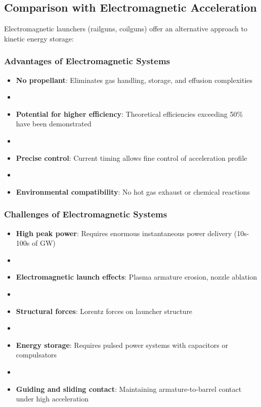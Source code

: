 \subsection{Comparison with Electromagnetic Acceleration}
Electromagnetic launchers (railguns, coilguns) offer an alternative approach to kinetic energy storage:

\subsubsection{Advantages of Electromagnetic Systems}
\begin{itemize}
    \item \textbf{No propellant}: Eliminates gas handling, storage, and effusion complexities
    \item \item \textbf{Potential for higher efficiency}: Theoretical efficiencies exceeding 50\% have been demonstrated
    \item \item \textbf{Precise control}: Current timing allows fine control of acceleration profile
    \item \item \textbf{Environmental compatibility}: No hot gas exhaust or chemical reactions
\end{itemize}

\subsubsection{Challenges of Electromagnetic Systems}
\begin{itemize}
    \item \textbf{High peak power}: Requires enormous instantaneous power delivery (10s-100s of GW)
    \item \item \textbf{Electromagnetic launch effects}: Plasma armature erosion, nozzle ablation
    \item \item \textbf{Structural forces}: Lorentz forces on launcher structure
    \item \item \textbf{Energy storage}: Requires pulsed power systems with capacitors or compulsators
    \item \item \textbf{Guiding and sliding contact}: Maintaining armature-to-barrel contact under high acceleration
\end{itemize}

